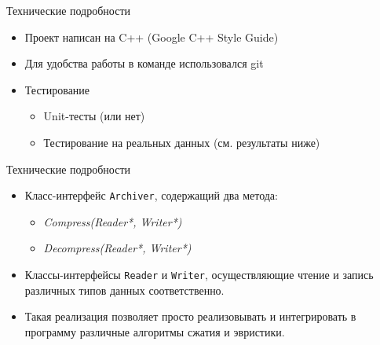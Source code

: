 \documentclass[12pt]{beamer}
\begin{document}
\begin{frame}{Технические подробности}

    \begin{itemize}
    
        \item <1-> Проект написан на C++ (Google C++ Style Guide)

        \item <2-> Для удобства работы в команде использовался git

        \item <3-> Тестирование

        \begin{itemize}

            \item Unit-тесты (или нет) 

            \item Тестирование на реальных данных (см. результаты ниже)
        
        \end{itemize}

    \end{itemize}

\end{frame}

\begin{frame}{Технические подробности}

    \begin{itemize}

        \item Класс-интерфейс \texttt{Archiver}, содержащий два метода:
        
        \begin{itemize}

            \item \textit{Compress(Reader*, Writer*)}

            \item \textit{Decompress(Reader*, Writer*)}

        \end{itemize}

        \item Классы-интерфейсы \texttt{Reader} и \texttt{Writer}, осуществляющие чтение и запись различных типов данных соответственно.  

        \item Такая реализация позволяет просто реализовывать и интегрировать в программу различные алгоритмы сжатия и эвристики.
    
    \end{itemize} 

\end{frame}
\end{document}
